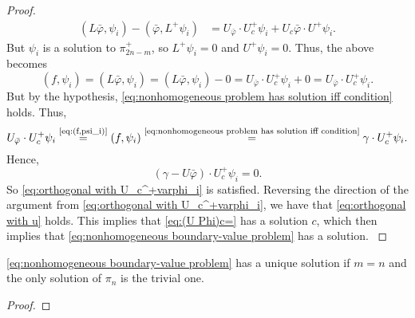 \documentclass[11pt, oneside, a4paper]{article}
\begin{document}
\begin{proof}
{\begin{equation}
        \begin{split}
        (L\bar{\varphi},\psi_i) - (\bar{\varphi}, L^+\psi_i) &= U_{\bar{\varphi}}\cdot U_c^+\psi_i + U_c\bar{\varphi}\cdot U^+\psi_i.
        \end{split}
    \end{equation}
    But $\psi_i$ is a solution to $\pi^+_{2n-m}$, so $L^+\psi_i=0$ and $U^+\psi_i=0$. Thus, the above becomes
    \begin{equation}\label{eq:(f,psi_i)}
        (f,\psi_i)=(L\bar{\varphi},\psi_i) = (L\bar{\varphi},\psi_i) - 0 =  U_{\bar{\varphi}}\cdot U_c^+\psi_i + 0 =  U_{\bar{\varphi}}\cdot U_c^+\psi_i.
    \end{equation}
    But by the hypothesis, \ref{eq:nonhomogeneous problem has solution iff condition} holds. Thus, 
    \[
        U_{\bar{\varphi}}\cdot U_c^+\psi_i \stackrel{\text{\ref{eq:(f,psi_i)}}}{=} (f,\psi_i) \stackrel{\text{\ref{eq:nonhomogeneous problem has solution iff condition}}}{=} \gamma\cdot U_c^+\psi_i.
    \]
    Hence,
    \[(\gamma-U\bar{\varphi})\cdot U_c^+\psi_i=0.\]
    So \ref{eq:orthogonal with U_c^+varphi_i} is satisfied. Reversing the direction of the argument from \ref{eq:orthogonal with U_c^+varphi_i}, we have that \ref{eq:orthogonal with u} holds. This implies that \ref{eq:(U Phi)c=} has a solution $c$, which then implies that \ref{eq:nonhomogeneous boundary-value problem} has a solution.
    }
\end{proof}

\begin{cor}
    \ref{eq:nonhomogeneous boundary-value problem} has a unique solution if $m=n$ and the only solution of $\pi_n$ is the trivial one.
\end{cor}
\begin{proof}
\end{proof}
\end{document}
